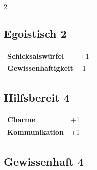 \begin{multicols}{2}
\begin{tcolorbox}

\end{tcolorbox}

\begin{tcolorbox}
    \subsection*{Egoistisch \hfill \small{2 }}
    \tcblower




\begin{tabular}{@{}ll@{}}
    \textbf{Schicksalswürfel} & +1\\
    \textbf{Gewissenhaftigkeit} & -1\\
\end{tabular}


\end{tcolorbox}

\begin{tcolorbox}
    \subsection*{Hilfsbereit \hfill \small{4 }}
    \tcblower




\begin{tabular}{@{}ll@{}}
    \textbf{Charme} & +1\\
    \textbf{Kommunikation} & +1\\
\end{tabular}


\end{tcolorbox}

\begin{tcolorbox}
    \subsection*{Gewissenhaft \hfill \small{4 }}
    \tcblower





\end{tcolorbox}
\end{multicols}
